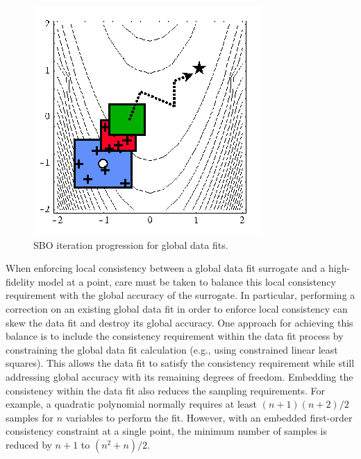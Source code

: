 \begin{figure}
  \centering
  \includegraphics[width=.4\textwidth]{images/sbo_df}
  \caption{SBO iteration progression for global data fits.}
  \label{fig:sbo_df}
\end{figure}
When enforcing local consistency between a global data fit surrogate
and a high-fidelity model at a point, care must be taken to balance
this local consistency requirement with the global accuracy of the
surrogate.  In particular, performing a correction on an existing
global data fit in order to enforce local consistency can skew the
data fit and destroy its global accuracy.  One approach for achieving
this balance is to include the consistency requirement within the data
fit process by constraining the global data fit calculation (e.g.,
using constrained linear least squares).  This allows the data fit to
satisfy the consistency requirement while still addressing global
accuracy with its remaining degrees of freedom.
Embedding the consistency within the data fit also reduces the
sampling requirements.  For example, a quadratic polynomial normally
requires at least $(n+1)(n+2)/2$ samples for $n$ variables to perform
the fit.  However, with an embedded first-order consistency constraint
at a single point, the minimum number of samples is reduced by $n+1$ 
to $(n^2+n)/2$.

